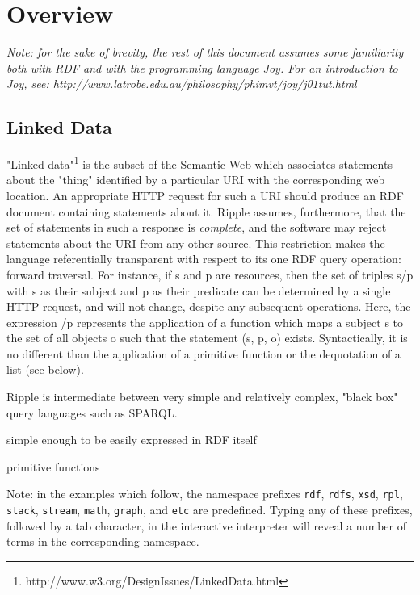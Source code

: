 \documentclass[runningheads]{llncs}
\begin{document}
\section{Overview}

{\it Note: for the sake of brevity, the rest of this document assumes some familiarity both with RDF and with the programming language Joy.  For an introduction to Joy, see: http://www.latrobe.edu.au/philosophy/phimvt/joy/j01tut.html}

\subsection{Linked Data}

"Linked data"\footnote{http://www.w3.org/DesignIssues/LinkedData.html} is the subset of the Semantic Web which associates statements about the "thing" identified by a particular URI with the corresponding web location.  An appropriate HTTP request for such a URI should produce an RDF document containing statements about it.  Ripple assumes, furthermore, that the set of statements in such a response is \emph{complete}, and the software may reject statements about the URI from any other source.  This restriction makes the language referentially transparent with respect to its one RDF query operation: forward traversal.  For instance, if s and p are resources, then the set of triples s/p with s as their subject and p as their predicate can be determined by a single HTTP request, and will not change, despite any subsequent operations.  Here, the expression /p represents the application of a function which maps a subject s to the set of all objects o such that the statement (s, p, o) exists.  Syntactically, it is no different than the application of a primitive function or the dequotation of a list (see below).




Ripple is intermediate between very simple 
and relatively complex, "black box" query languages such as SPARQL.

simple enough to be easily expressed in RDF itself

primitive functions






Note: in the examples which follow, the namespace prefixes \texttt{rdf}, \texttt{rdfs}, \texttt{xsd}, \texttt{rpl}, \texttt{stack}, \texttt{stream}, \texttt{math}, \texttt{graph}, and \texttt{etc} are predefined.  Typing any of these prefixes, followed by a tab character, in the interactive interpreter will reveal a number of terms in the corresponding namespace.
\end{document}
